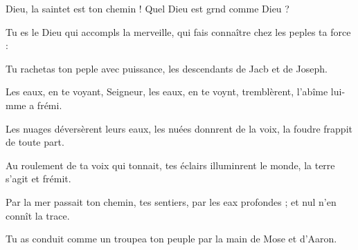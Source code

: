 \item Dieu, la saintet est ton chemin !\psstar{} Quel Dieu est grnd comme Dieu ?
\item Tu es le Dieu qui accompls la merveille,\psstar{} qui fais connaître chez les peples ta force :
\item Tu rachetas ton peple avec puissance,\psstar{} les descendants de Jacb et de Joseph.
\item Les eaux, en te voyant, Seigneur,\pscross{} les eaux, en te voynt, tremblèrent,\psstar{} l’abîme lui-mme a frémi.
\item Les nuages déversèrent leurs eaux,\pscross{} les nuées donnrent de la voix,\psstar{} la foudre frappit de toute part.
\item Au roulement de ta voix qui tonnait,\pscross{} tes éclairs illuminrent le monde,\psstar{} la terre s’agit et frémit.
\item Par la mer passait ton chemin,\pscross{} tes sentiers, par les eax profondes ;\psstar{} et nul n’en connît la trace.
\item Tu as conduit comme un troupea ton peuple\psstar{} par la main de Mose et d’Aaron.